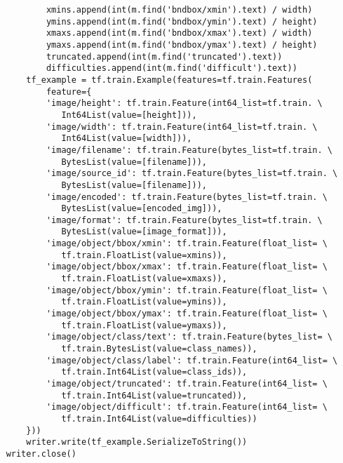 \begin{verbatim}
            xmins.append(int(m.find('bndbox/xmin').text) / width)
            ymins.append(int(m.find('bndbox/ymin').text) / height)
            xmaxs.append(int(m.find('bndbox/xmax').text) / width)
            ymaxs.append(int(m.find('bndbox/ymax').text) / height)
            truncated.append(int(m.find('truncated').text))
            difficulties.append(int(m.find('difficult').text))
        tf_example = tf.train.Example(features=tf.train.Features(
            feature={
            'image/height': tf.train.Feature(int64_list=tf.train. \
               Int64List(value=[height])),
            'image/width': tf.train.Feature(int64_list=tf.train. \
               Int64List(value=[width])),
            'image/filename': tf.train.Feature(bytes_list=tf.train. \
               BytesList(value=[filename])),
            'image/source_id': tf.train.Feature(bytes_list=tf.train. \
               BytesList(value=[filename])),
            'image/encoded': tf.train.Feature(bytes_list=tf.train. \
               BytesList(value=[encoded_img])),
            'image/format': tf.train.Feature(bytes_list=tf.train. \
               BytesList(value=[image_format])),
            'image/object/bbox/xmin': tf.train.Feature(float_list= \
               tf.train.FloatList(value=xmins)),
            'image/object/bbox/xmax': tf.train.Feature(float_list= \
               tf.train.FloatList(value=xmaxs)),
            'image/object/bbox/ymin': tf.train.Feature(float_list= \
               tf.train.FloatList(value=ymins)),
            'image/object/bbox/ymax': tf.train.Feature(float_list= \
               tf.train.FloatList(value=ymaxs)),
            'image/object/class/text': tf.train.Feature(bytes_list= \
               tf.train.BytesList(value=class_names)),
            'image/object/class/label': tf.train.Feature(int64_list= \
               tf.train.Int64List(value=class_ids)),
            'image/object/truncated': tf.train.Feature(int64_list= \
               tf.train.Int64List(value=truncated)),
            'image/object/difficult': tf.train.Feature(int64_list= \
               tf.train.Int64List(value=difficulties))
        }))
        writer.write(tf_example.SerializeToString())
    writer.close()
        \end{verbatim}
